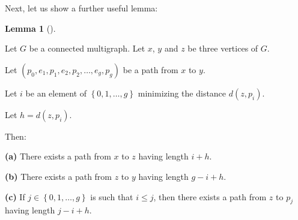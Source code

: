\documentclass[numbers=enddot,12pt,final,onecolumn,notitlepage]{scrartcl}%
\theoremstyle{definition}
\newtheorem{lem}[theo]{Lemma}
\newenvironment{lemma}[1][]
{\begin{lem}[#1]\begin{leftbar}}
{\end{leftbar}\end{lem}}
\newcommand{\set}[1]{\left\{ #1 \right\}}
\newcommand{\tup}[1]{\left( #1 \right)}
\begin{document}
Next, let us show a further useful lemma:

\begin{lemma} \label{lem.mt2.tropigrass.3}
Let $G$ be a connected multigraph.
Let $x$, $y$ and $z$ be three vertices of $G$.

Let $\tup{p_0, e_1, p_1, e_2, p_2, \ldots, e_g, p_g}$ be a path
from $x$ to $y$.

Let $i$ be an element of $\set{0, 1, \ldots, g}$ minimizing the
distance $d \tup{z, p_i}$.

Let $h = d \tup{z, p_i}$.

Then:

\textbf{(a)} There exists a path from $x$ to $z$ having
length $i + h$.

\textbf{(b)} There exists a path from $z$ to $y$ having
length $g - i + h$.

\textbf{(c)} If $j \in \set{0, 1, \ldots, g}$ is such that
$i \leq j$, then there exists a path from $z$ to $p_j$
having length $j - i + h$.
\end{lemma}
\end{document}
